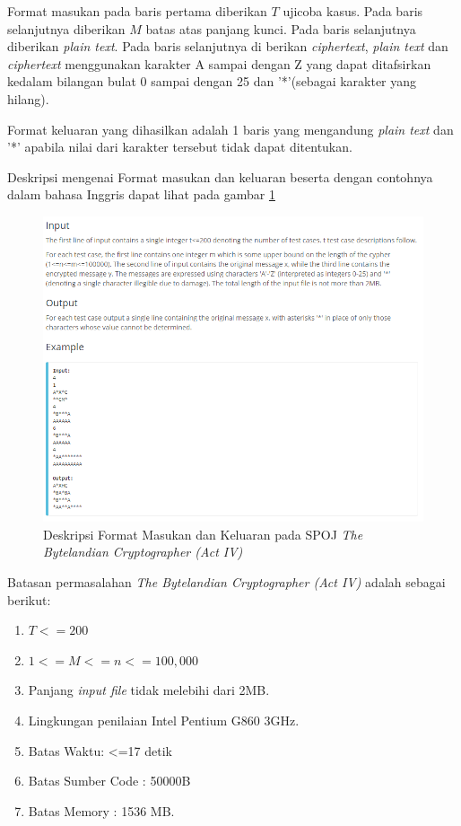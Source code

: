 	
	Format masukan pada baris pertama diberikan $T$ ujicoba kasus. Pada baris selanjutnya diberikan $M$ batas atas panjang kunci. Pada baris selanjutnya diberikan \textit{plain text}. Pada baris selanjutnya di berikan \textit{ciphertext}, \textit{plain text} dan \textit{ciphertext} menggunakan karakter A sampai dengan Z yang dapat ditafsirkan kedalam bilangan bulat 0 sampai dengan 25 dan '*'(sebagai karakter yang hilang).
	
	
	Format keluaran yang dihasilkan adalah 1 baris yang mengandung \textit{plain text} dan '*' apabila nilai dari karakter tersebut tidak dapat ditentukan.
	
	
	Deskripsi mengenai Format masukan dan keluaran beserta dengan contohnya dalam bahasa Inggris dapat lihat pada gambar \ref{fig:crypto4_io}
	\begin{figure}[H]
		\centering
		\includegraphics[scale=0.5]{images/bab2/crypto_io.png}
		\caption{Deskripsi Format Masukan dan Keluaran pada SPOJ \textit{The Bytelandian Cryptographer (Act IV)}}
		\label{fig:crypto4_io}
	\end{figure}
	
	
	Batasan permasalahan \textit{The Bytelandian Cryptographer (Act IV)} adalah sebagai berikut:
	\begin{enumerate}
		\item $T<=200$
		\item $1<=M<=n<=100,000$
		\item Panjang \textit{input file} tidak melebihi dari 2MB.
		\item Lingkungan penilaian Intel Pentium G860 3GHz.
		\item Batas Waktu: <=17 detik
		\item Batas Sumber Code : 50000B
		\item Batas Memory : 1536 MB.                 
	\end{enumerate}\cite{piwakowski_crypto4_2004}

